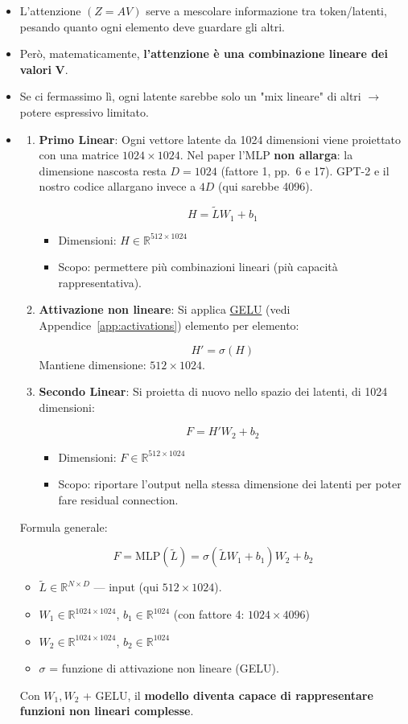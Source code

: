 \documentclass[
  11pt,
]{article}
\begin{document}
\begin{itemize}
\item
  L'attenzione \((Z = AV)\) serve a mescolare
  informazione tra token/latenti, pesando quanto ogni elemento deve
  guardare gli altri.
\item
  Però, matematicamente, \textbf{l'attenzione è una
  combinazione lineare dei valori} \(\mathbf{V}\).
\item
  Se ci fermassimo lì, ogni latente sarebbe solo un "mix lineare" di
  altri \(\rightarrow\) potere espressivo limitato.
\item

\begin{enumerate}
\item \textbf{Primo Linear}: Ogni vettore latente da 1024 dimensioni viene proiettato con una matrice $1024 \times 1024$. Nel paper l'MLP \textbf{non allarga}: la dimensione nascosta resta $D = 1024$ (fattore 1, pp.~6 e 17). GPT-2 e il nostro codice allargano invece a $4D$ (qui sarebbe 4096).

\[
H = \tilde{L} W_1 + b_1
\]
\begin{itemize}
\item Dimensioni: $H \in \mathbb{R}^{512 \times 1024}$
\item Scopo: permettere più combinazioni lineari (più capacità rappresentativa).
\end{itemize}
\item \textbf{Attivazione non lineare}: Si applica \hyperref[app:activations]{GELU} (vedi Appendice~\ref{app:activations}) elemento per elemento:

\[
H' = \sigma(H)
\]
Mantiene dimensione: $512 \times 1024$.
\item \textbf{Secondo Linear}: Si proietta di nuovo nello spazio dei latenti, di 1024 dimensioni:

\[
F = H' W_2 + b_2
\]
\begin{itemize}
\item Dimensioni: $F \in \mathbb{R}^{512 \times 1024}$
\item Scopo: riportare l'output nella stessa dimensione dei latenti per poter fare residual connection.
\end{itemize}
\end{enumerate}

Formula generale:

\[
F = \text{MLP}(\tilde{L}) = \sigma(\tilde{L} W_1 + b_1) W_2 + b_2
\]
\begin{itemize}
\item $\tilde{L} \in \mathbb{R}^{N \times D}$ --- input (qui $512 \times 1024$).
\item $W_1 \in \mathbb{R}^{1024 \times 1024}$, $b_1 \in \mathbb{R}^{1024}$ (con fattore 4: $1024 \times 4096$)
\item $W_2 \in \mathbb{R}^{1024 \times 1024}$, $b_2 \in \mathbb{R}^{1024}$
\item $\sigma$ = funzione di attivazione non lineare (GELU).
\end{itemize}

Con
  \(W_{1},W_{2}\) + GELU, il \textbf{modello diventa capace di
  rappresentare funzioni non lineari complesse}.
\end{itemize}
\end{document}
